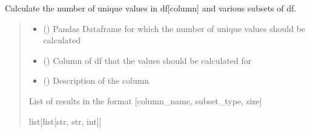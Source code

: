 \documentclass[letterpaper,10pt,english]{sphinxmanual}
\begin{document}
\begin{fulllineitems}
\label{\detokenize{get_stats:get_stats.get_stats_for_column}}
\pysigstartsignatures
{}
\pysigstopsignatures
\sphinxAtStartPar
Calculate the number of unique values in df{[}column{]} and various subsets of df.
\begin{quote}\begin{description}
\begin{itemize}
\item {} 
\sphinxAtStartPar
{} () \textendash{} Pandas Dataframe for which the number of unique values should be calculated

\item {} 
\sphinxAtStartPar
{} () \textendash{} Column of df that the values should be calculated for

\item {} 
\sphinxAtStartPar
{} () \textendash{} Description of the column

\end{itemize}

\sphinxAtStartPar
List of results in the format {[}column\_name, subset\_type, size{]}

\sphinxAtStartPar
list{[}list{[}str, str, int{]}{]}

\end{description}\end{quote}

\end{fulllineitems}

\end{document}
